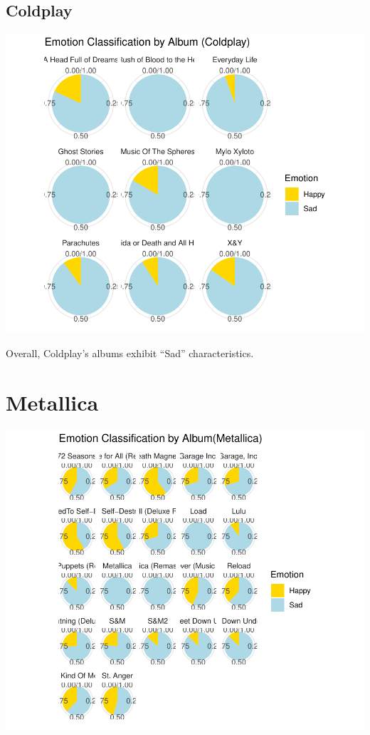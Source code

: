 \documentclass[11pt,preprint, authoryear]{elsarticle}
\numberwithin{equation}{section}
\numberwithin{figure}{section}
\numberwithin{table}{section}
\begin{document}
\hypertarget{coldplay-2}{%
\subsection{Coldplay}\label{coldplay-2}}

\includegraphics{Question3_files/figure-latex/unnamed-chunk-5-1.pdf}

Overall, Coldplay's albums exhibit ``Sad'' characteristics.

\hypertarget{metallica-2}{%
\section{Metallica}\label{metallica-2}}

\includegraphics{Question3_files/figure-latex/unnamed-chunk-6-1.pdf}
\end{document}
